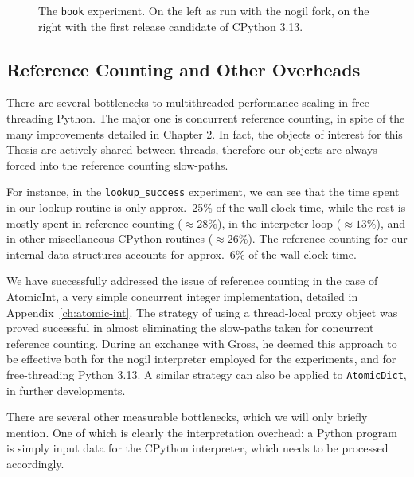 \begin{figure}
    \begin{centering}
        \scalebox{0.4}{}%
        \scalebox{0.4}{}
        \caption{The \texttt{book} experiment. On the left as run with the nogil fork, on the right with the first release candidate of CPython 3.13.}
        \label{fig:book-3.13}
    \end{centering}
\end{figure}

\subsection{Reference Counting and Other Overheads}\label{subsec:measurements-overheads}

There are several bottlenecks to multithreaded-performance scaling in free-threading Python.
The major one is concurrent reference counting, in spite of the many improvements detailed in Chapter 2.
In fact, the objects of interest for this Thesis are actively shared between threads, therefore our objects are always forced into the reference counting slow-paths.

For instance, in the \texttt{lookup\_success} experiment, we can see that the time spent in our lookup routine is only approx.\ 25\% of the wall-clock time, while the rest is mostly spent in reference counting ($\approx28\%$), in the interpeter loop ($\approx13\%$), and in other miscellaneous CPython routines ($\approx26\%$).
The reference counting for our internal data structures accounts for approx.\ 6\% of the wall-clock time.

We have successfully addressed the issue of reference counting in the case of AtomicInt, a very simple concurrent integer implementation, detailed in Appendix~\ref{ch:atomic-int}.
The strategy of using a thread-local proxy object was proved successful in almost eliminating the slow-paths taken for concurrent reference counting.
During an exchange with Gross, he deemed this approach to be effective both for the nogil interpreter employed for the experiments, and for free-threading Python 3.13.
A similar strategy can also be applied to \texttt{AtomicDict}, in further developments.

There are several other measurable bottlenecks, which we will only briefly mention.
One of which is clearly the interpretation overhead: a Python program is simply input data for the CPython interpreter, which needs to be processed accordingly.

